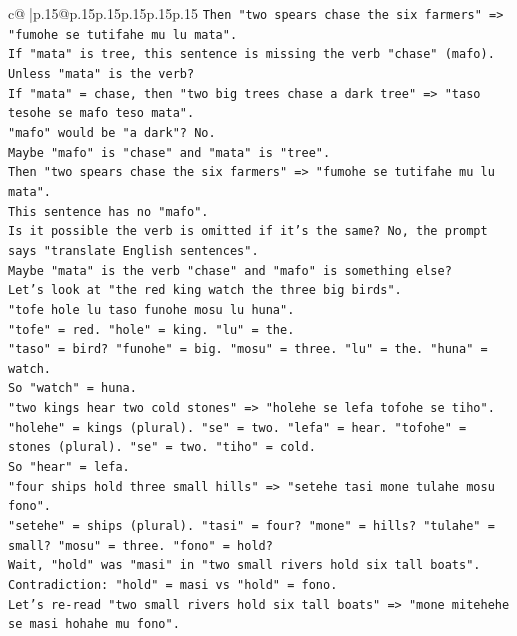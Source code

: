 \documentclass{article}
\begin{document}
{\begin{supertabular}{c@{$\;$}|p{.15\linewidth}@{}p{.15\linewidth}p{.15\linewidth}p{.15\linewidth}p{.15\linewidth}p{.15\linewidth}}
{{{\texttt{Then "two spears chase the six farmers" => "fumohe se tutifahe mu lu mata".} \\
\texttt{If "mata" is tree, this sentence is missing the verb "chase" (mafo).} \\
\texttt{Unless "mata" is the verb?} \\
\texttt{If "mata" = chase, then "two big trees chase a dark tree" => "taso tesohe se mafo teso mata".} \\
\texttt{"mafo" would be "a dark"? No.} \\
\texttt{Maybe "mafo" is "chase" and "mata" is "tree".} \\
\texttt{Then "two spears chase the six farmers" => "fumohe se tutifahe mu lu mata".} \\
\texttt{This sentence has no "mafo".} \\
\texttt{Is it possible the verb is omitted if it's the same? No, the prompt says "translate English sentences".} \\
\texttt{Maybe "mata" is the verb "chase" and "mafo" is something else?} \\
\texttt{Let's look at "the red king watch the three big birds".} \\
\texttt{"tofe hole lu taso funohe mosu lu huna".} \\
\texttt{"tofe" = red. "hole" = king. "lu" = the.} \\
\texttt{"taso" = bird? "funohe" = big. "mosu" = three. "lu" = the. "huna" = watch.} \\
\texttt{So "watch" = huna.} \\
\texttt{"two kings hear two cold stones" => "holehe se lefa tofohe se tiho".} \\
\texttt{"holehe" = kings (plural). "se" = two. "lefa" = hear. "tofohe" = stones (plural). "se" = two. "tiho" = cold.} \\
\texttt{So "hear" = lefa.} \\
\texttt{"four ships hold three small hills" => "setehe tasi mone tulahe mosu fono".} \\
\texttt{"setehe" = ships (plural). "tasi" = four? "mone" = hills? "tulahe" = small? "mosu" = three. "fono" = hold?} \\
\texttt{Wait, "hold" was "masi" in "two small rivers hold six tall boats".} \\
\texttt{Contradiction: "hold" = masi vs "hold" = fono.} \\
\texttt{Let's re{-}read "two small rivers hold six tall boats" => "mone mitehehe se masi hohahe mu fono".} \\
}}}
\end{supertabular}}
\end{document}
